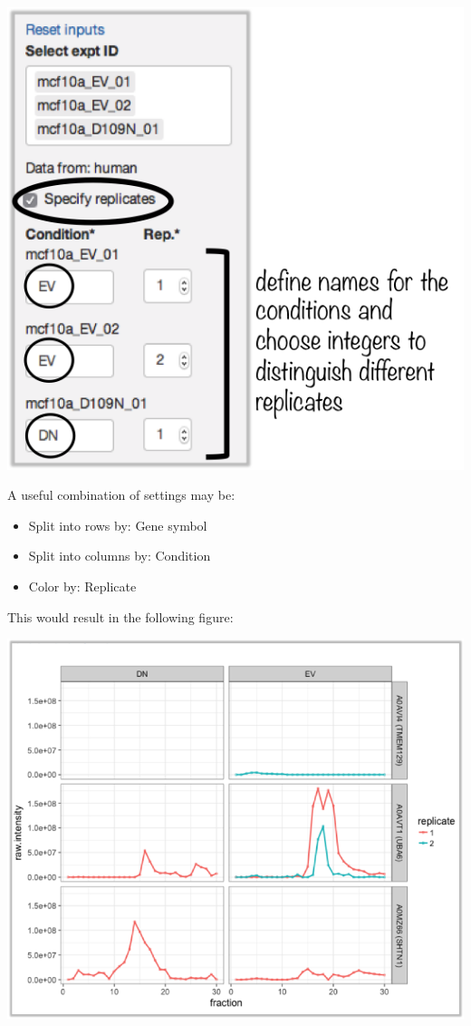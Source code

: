 \documentclass[letterpaper, twocolumn, 9pt]{article}
\begin{document}
\includegraphics[width=\columnwidth]{figures/ss_plotCustomizing02.png}

A useful combination of settings may be:
\begin{itemize}[noitemsep]
\item \textsf{Split into rows by:} Gene symbol
\item \textsf{Split into columns by:} Condition
\item \textsf{Color by:} Replicate
\end{itemize}

This would result in the following figure:

\includegraphics[width=\columnwidth]{figures/ss_plotCustomizing03.png}
\end{document}
